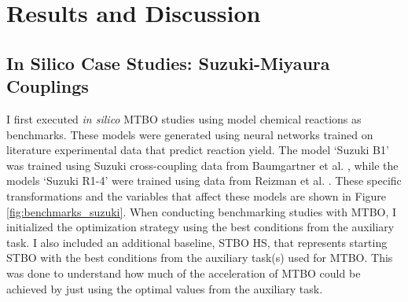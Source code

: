 \section{Results and Discussion}

\subsection{In Silico Case Studies: Suzuki-Miyaura Couplings}

I first executed \textit{in silico} MTBO studies using model chemical reactions as benchmarks. These models were generated using neural networks trained on literature experimental data that predict reaction yield. The model `Suzuki B1' was trained using Suzuki cross-coupling data from Baumgartner et al. \cite{Baumgartner2018}, while the models `Suzuki R1-4' were trained using data from Reizman et al. \cite{Reizman2016a}.  These specific transformations and the variables that affect these models are shown in Figure \ref{fig:benchmarks_suzuki}. When conducting benchmarking studies with MTBO, I initialized the optimization strategy using the best conditions from the auxiliary task.  I also included an additional baseline, STBO HS, that represents starting STBO with the best conditions from the auxiliary task(s) used for MTBO. This was done to understand how much of the acceleration of MTBO could be achieved by just using the optimal values from the auxiliary task.

